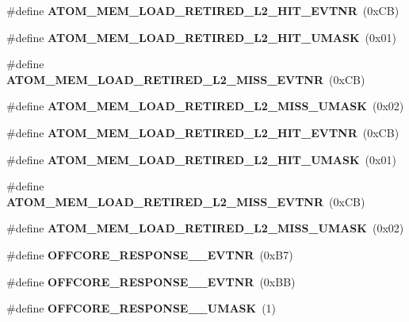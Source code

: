 \begin{DoxyCompactItemize}
\#define {\bfseries A\+T\+O\+M\+\_\+\+M\+E\+M\+\_\+\+L\+O\+A\+D\+\_\+\+R\+E\+T\+I\+R\+E\+D\+\_\+\+L2\+\_\+\+H\+I\+T\+\_\+\+E\+V\+T\+NR}~(0x\+C\+B)
\item 
\mbox{\label{types_8h_a692622a84797600e7b04df9a1eacc475}} 
\#define {\bfseries A\+T\+O\+M\+\_\+\+M\+E\+M\+\_\+\+L\+O\+A\+D\+\_\+\+R\+E\+T\+I\+R\+E\+D\+\_\+\+L2\+\_\+\+H\+I\+T\+\_\+\+U\+M\+A\+SK}~(0x01)
\item 
\mbox{\label{types_8h_a3c0d272f11177100e9b18f3772efe0e2}} 
\#define {\bfseries A\+T\+O\+M\+\_\+\+M\+E\+M\+\_\+\+L\+O\+A\+D\+\_\+\+R\+E\+T\+I\+R\+E\+D\+\_\+\+L2\+\_\+\+M\+I\+S\+S\+\_\+\+E\+V\+T\+NR}~(0x\+C\+B)
\item 
\mbox{\label{types_8h_a61f57e34652a6d1477797b48401801da}} 
\#define {\bfseries A\+T\+O\+M\+\_\+\+M\+E\+M\+\_\+\+L\+O\+A\+D\+\_\+\+R\+E\+T\+I\+R\+E\+D\+\_\+\+L2\+\_\+\+M\+I\+S\+S\+\_\+\+U\+M\+A\+SK}~(0x02)
\item 
\mbox{\label{types_8h_ae22b6f56994cf7ace060db72ae78ed02}} 
\#define {\bfseries A\+T\+O\+M\+\_\+\+M\+E\+M\+\_\+\+L\+O\+A\+D\+\_\+\+R\+E\+T\+I\+R\+E\+D\+\_\+\+L2\+\_\+\+H\+I\+T\+\_\+\+E\+V\+T\+NR}~(0x\+C\+B)
\item 
\mbox{\label{types_8h_a692622a84797600e7b04df9a1eacc475}} 
\#define {\bfseries A\+T\+O\+M\+\_\+\+M\+E\+M\+\_\+\+L\+O\+A\+D\+\_\+\+R\+E\+T\+I\+R\+E\+D\+\_\+\+L2\+\_\+\+H\+I\+T\+\_\+\+U\+M\+A\+SK}~(0x01)
\item 
\mbox{\label{types_8h_a3c0d272f11177100e9b18f3772efe0e2}} 
\#define {\bfseries A\+T\+O\+M\+\_\+\+M\+E\+M\+\_\+\+L\+O\+A\+D\+\_\+\+R\+E\+T\+I\+R\+E\+D\+\_\+\+L2\+\_\+\+M\+I\+S\+S\+\_\+\+E\+V\+T\+NR}~(0x\+C\+B)
\item 
\mbox{\label{types_8h_a61f57e34652a6d1477797b48401801da}} 
\#define {\bfseries A\+T\+O\+M\+\_\+\+M\+E\+M\+\_\+\+L\+O\+A\+D\+\_\+\+R\+E\+T\+I\+R\+E\+D\+\_\+\+L2\+\_\+\+M\+I\+S\+S\+\_\+\+U\+M\+A\+SK}~(0x02)
\item 
\mbox{\label{types_8h_af67d73bb035f756cc06ee85a12010f76}} 
\#define {\bfseries O\+F\+F\+C\+O\+R\+E\+\_\+\+R\+E\+S\+P\+O\+N\+S\+E\+\_\+\_\+\+E\+V\+T\+NR}~(0x\+B7)
\item 
\mbox{\label{types_8h_af6ff69774adbccef6d6d826133db3820}} 
\#define {\bfseries O\+F\+F\+C\+O\+R\+E\+\_\+\+R\+E\+S\+P\+O\+N\+S\+E\+\_\+\_\+\+E\+V\+T\+NR}~(0x\+B\+B)
\item 
\mbox{\label{types_8h_afe28510b6b326aaf230b05fe14e77823}} 
\#define {\bfseries O\+F\+F\+C\+O\+R\+E\+\_\+\+R\+E\+S\+P\+O\+N\+S\+E\+\_\+\_\+\+U\+M\+A\+SK}~(1)
\item 
\mbox{\label{types_8h_a9a59a19b5afeb80547a688cd4521b4a1}} 

\end{DoxyCompactItemize}
